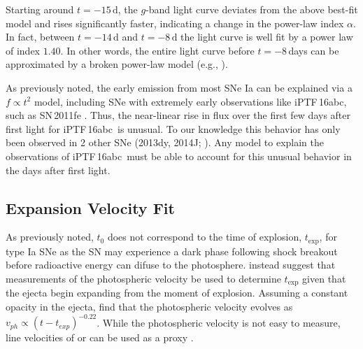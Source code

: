 \documentclass[twocolumn]{aastex61}
\newcommand{\abc}{iPTF\,16abc}
\newcommand{\amiller}[1]{{\color{blue} amiller: {#1}}}
\begin{document}
Starting around $t=-15\,\textrm{d}$, the $g$-band light curve 
deviates from the above best-fit model and 
rises significantly faster, indicating a
change in the power-law index $\alpha$. In fact, between $t=-14\,\mathrm{d}$ and $t=-8\,\mathrm{d}$ the light curve is well fit by a power law of index $1.40$. In other words, the entire light curve
before $t=-8$\,days can be approximated by a broken power-law model
(e.g.,
\citealt{2016arXiv161202097Z,
  2016arXiv161202725Z}).

As previously noted, the early emission from most SNe Ia can be explained via a $f \propto t^2$ model, including SNe with extremely early observations like \abc, such as SN\,2011fe \citep{2011Natur.480..344N}. Thus, the near-linear rise in flux over the first few days after first light for \abc\ is unusual. To our knowledge this behavior has only been observed in 2 other SNe (2013dy, 2014J; \citealt{2013ApJ...778L..15Z,2014ApJ...783L..24Z}). Any model to explain the observations of \abc\ must be able to account for this unusual behavior in the days after first light.  



\subsection{Expansion Velocity Fit}
\label{sec:early_vel}

As previously noted, $t_0$ does not correspond to the time of 
explosion, $t_\mathrm{exp}$, for type Ia SNe as the SN may 
experience a dark phase following shock breakout before radioactive 
energy can difuse to the photosphere. \citet{2014ApJ...784...85P} 
instead suggest that measurements of the photospheric velocity be 
used to determine $t_\mathrm{exp}$ given that the ejecta begin 
expanding from the moment of explosion.  Assuming a
constant opacity in the ejecta, \citeauthor{2014ApJ...784...85P} 
find that the photospheric velocity evolves as
$v_{ph}\propto(t-t_{exp})^{-0.22}$. While the photospheric velocity
is not easy to measure, line velocities of  or 
can be used as a proxy
\citep{2014ApJ...784...85P,2016ApJ...826..144S}.
\end{document}
